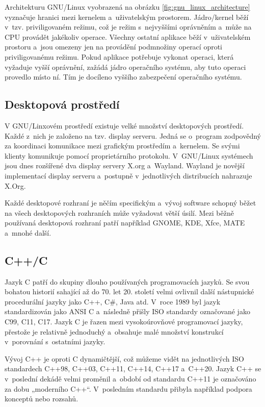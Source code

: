 Architekturu GNU/Linux vyobrazená na obrázku \ref{fig:gnu_linux_architecture} vyznačuje hranici mezi kernelem a uživatelským prostorem. Jádro/kernel běží v tzv. priviligovaném
režimu, což je režim s nejvyššími oprávněním a může na CPU provádět jakékoliv operace. Všechny ostatní aplikace běží v uživatelském prostoru a jsou omezeny jen na provádění 
podmnožiny operací oproti priviligovanému režimu. Pokud aplikace potřebuje vykonat operaci, která vyžaduje vyšší oprávnění, zažádá jádro operačního systému, aby tuto operaci 
provedlo místo ní. Tím je docíleno vyššího zabezpečení operačního systému.

\subsection*{Desktopová prostředí}

V GNU/Linxovém prostředí existuje velké množství desktopových prostředí. Každé z nich je založeno na tzv. display serveru. Jedná se o program zodpovědný za koordinaci
komunikace mezi grafickým prostředím a kernelem. Se svými klienty komunikuje pomocí proprietárního protokolu. V GNU/Linux systémech jsou dnes rozšířené dva display servery
X.org a Wayland. Wayland je novější implementací display serveru a postupně v jednotlivých distribucích nahrazuje X.Org.

Každé desktopové rozhraní je něčím specifickým a vývoj software schopný běžet na všech desktopových rozhraních může vyžadovat větší úsilí. Mezi běžně používaná desktopová 
rozhraní patří například GNOME, KDE, Xfce, MATE a mnohé další.

\subsection{C++/C}

Jazyk C patří do skupiny dlouho používaných programovacích jazyků. Se svou bohatou historií sahající až do 70. let 20. století velmi ovlivnil další nástupnické procedurální
jazyky jako C++, C\#, Java atd. V roce 1989 byl jazyk standardizován jako ANSI C a následně přišly ISO standardy označované jako C99, C11, C17. Jazyk C je řazen mezi
vysokoúrovňové programovací jazyky, přestože je relativně jednoduchý a obsahuje malé množství konstrukcí v porovnání s ostatními jazyky.\cite{CReference}

Vývoj C++ je oproti C dynamičtější, což můžeme vidět na jednotlivých ISO standardech C++98, C++03, C++11, C++14, C++17 a C++20. Jazyk C++ se v poslední dekádě velmi
proměnil a období od standardu C++11 je označováno za dobu „moderního C++“. V posledním standardu přibyla například podpora konceptů nebo rozsahů.\cite{CPPReference}

